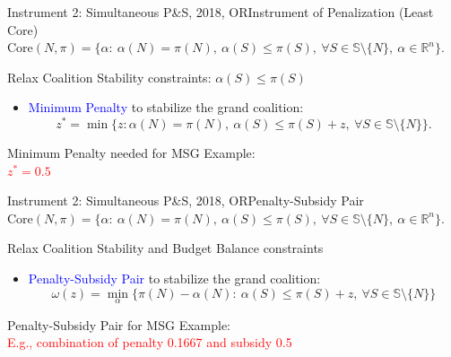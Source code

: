 \documentclass[14pt]{beamer}
\newcommand{\R}{\mathbb{R}}
\begin{document}
\begin{frame}{Instrument 2: Simultaneous P\&S, {\footnotesize 2018, OR}}{Instrument of Penalization (Least Core)}
\vspace{3mm}
{\footnotesize $\mathrm{Core}(N,\pi) = \bigg\{ \alpha:~ \alpha(N)=\pi(N), ~\alpha(S) \leq \pi(S), ~\forall S \in \mathbb{S} \setminus \{N\},~\alpha \in \R^n   \bigg\}$.}
\begin{shaded}
\centering Relax Coalition Stability constraints: $\alpha(S) \leq \pi(S)$
\end{shaded}
\begin{itemize}
\item \textcolor{blue}{Minimum Penalty} to stabilize the grand coalition:
\small
\begin{equation*}
z^* = \min \big\{ z:\alpha(N)= \pi(N),~\alpha(S) \leq \pi(S)+z, ~\forall S \in \mathbb{S} \setminus \{N\} \big\}.
\end{equation*}
\end{itemize}
\pause
\vspace{-7mm}
\begin{shaded}
\centering
\small
Minimum Penalty needed for MSG Example:\\ 
\vspace{2mm}
\textcolor{red}{$z^* = 0.5$}
\end{shaded}
\end{frame}



\begin{frame}{Instrument 2: Simultaneous P\&S, {\footnotesize 2018, OR}}{Penalty-Subsidy Pair}
\vspace{3mm}
{\footnotesize $\mathrm{Core}(N,\pi) = \bigg\{ \alpha:~ \alpha(N)=\pi(N), ~\alpha(S) \leq \pi(S), ~\forall S \in \mathbb{S} \setminus \{N\},~\alpha \in \R^n   \bigg\}$.}
\begin{shaded}
\centering Relax Coalition Stability and Budget Balance constraints
\end{shaded}
\begin{itemize}
\item \textcolor{blue}{Penalty-Subsidy Pair} to stabilize the grand coalition:
\small
\begin{equation*}
\omega(z) = \min_{\alpha} \bigg\{ \pi(N) - \alpha(N):~\alpha(S) \leq \pi(S)+z,~\forall S \in \mathbb{S} \setminus \{N\} \bigg\}
\end{equation*}
\end{itemize}
\pause
\vspace{-7mm}
\begin{shaded}
\centering
\small
Penalty-Subsidy Pair for MSG Example:\\
\vspace{2mm}
\textcolor{red}{E.g., combination of penalty 0.1667 and subsidy 0.5}
\end{shaded}
\end{frame}
\end{document}
